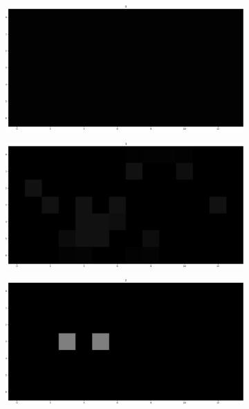 \documentclass[runningheads]{llncs}
\begin{document}
\begin{figure}
	\centering
	\begin{subfigure}[b]{0.32\textwidth}
		\centering
		\includegraphics[width=\textwidth]{imgs/prediction_default_lab/it_00.png}
		\caption{}
		\label{fig:localization_step0}
	\end{subfigure}
	\begin{subfigure}[b]{0.32\textwidth}
		\centering
		\includegraphics[width=\textwidth]{imgs/prediction_default_lab/it_01.png}
		\caption{}
		\label{fig:localization_step1}
	\end{subfigure}
	\begin{subfigure}[b]{0.32\textwidth}
		\centering
		\includegraphics[width=\textwidth]{imgs/prediction_default_lab/it_02.png}
		\caption{}
		\label{fig:localization_step2}
	\end{subfigure}
	

\end{figure}
\end{document}
